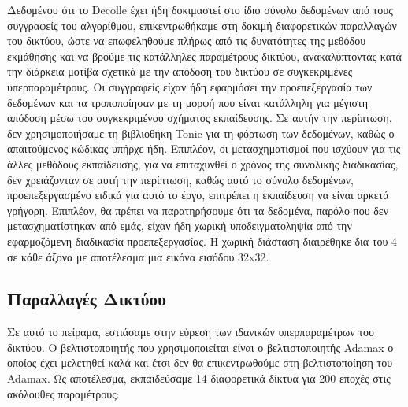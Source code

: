 \documentclass[12pt]{report}
\begin{document}
Δεδομένου ότι το \textlatin{Decolle} έχει ήδη δοκιμαστεί στο ίδιο σύνολο δεδομένων από τους συγγραφείς του αλγορίθμου, επικεντρωθήκαμε στη δοκιμή διαφορετικών παραλλαγών του δικτύου, ώστε να επωφεληθούμε πλήρως από τις δυνατότητες της μεθόδου εκμάθησης και να βρούμε τις κατάλληλες παραμέτρους δικτύου, ανακαλύπτοντας κατά την διάρκεια μοτίβα σχετικά με την απόδοση του δικτύου σε συγκεκριμένες υπερπαραμέτρους. Οι συγγραφείς είχαν ήδη εφαρμόσει την προεπεξεργασία των δεδομένων και τα τροποποίησαν με τη μορφή που είναι κατάλληλη για μέγιστη απόδοση μέσω του συγκεκριμένου σχήματος εκπαίδευσης. Σε αυτήν την περίπτωση, δεν χρησιμοποιήσαμε τη βιβλιοθήκη \textlatin{Tonic} για τη φόρτωση των δεδομένων, καθώς ο απαιτούμενος κώδικας υπήρχε ήδη. Επιπλέον, οι μετασχηματισμοί που ισχύουν για τις άλλες μεθόδους εκπαίδευσης, για να επιταχυνθεί ο χρόνος της συνολικής διαδικασίας, δεν χρειάζονταν σε αυτή την περίπτωση, καθώς αυτό το σύνολο δεδομένων, προεπεξεργασμένο ειδικά για αυτό το έργο, επιτρέπει η εκπαίδευση να είναι αρκετά γρήγορη. Επιπλέον, θα πρέπει να παρατηρήσουμε ότι τα δεδομένα, παρόλο που δεν μετασχηματίστηκαν από εμάς, είχαν ήδη χωρική υποδειγματοληψία από την εφαρμοζόμενη διαδικασία προεπεξεργασίας. Η χωρική διάσταση διαιρέθηκε δια του 4 σε κάθε άξονα με αποτέλεσμα μια εικόνα εισόδου 32\textlatin{x}32.

\subsection{Παραλλαγές Δικτύου}

Σε αυτό το πείραμα, εστιάσαμε στην εύρεση των ιδανικών υπερπαραμέτρων του δικτύου. Ο βελτιστοποιητής που χρησιμοποιείται είναι ο βελτιστοποιητής \textlatin{Adamax} ο οποίος έχει μελετηθεί καλά και έτσι δεν θα επικεντρωθούμε στη βελτιστοποίηση του \textlatin{Adamax}. Ως αποτέλεσμα, εκπαιδεύσαμε 14 διαφορετικά δίκτυα για 200 εποχές στις ακόλουθες παραμέτρους:
\end{document}
